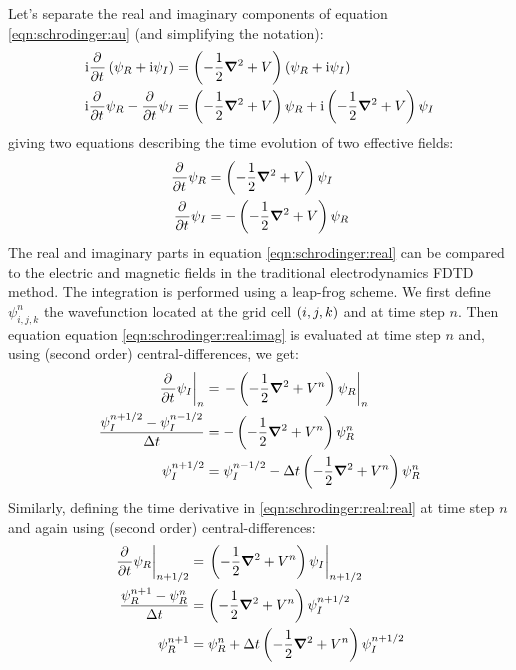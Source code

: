 Let's separate the real and imaginary components of equation
\eqref{eqn:schrodinger:au} (and simplifying the notation):
\begin{align}
\textrm{i} \frac{\partial^{{}}   }{\partial t^{{}}} \left(  \psi_R + \textrm{i} \psi_I \right)
    & = \left( -\frac{1}{2} \bm{\nabla}^2 + V  \right)
        \left(  \psi_R + \textrm{i} \psi_I \right) \\
\textrm{i} \frac{\partial^{{}}   }{\partial t^{{}}} \psi_R - \frac{\partial^{{}}   }{\partial t^{{}}} \psi_I
    & = \left( -\frac{1}{2} \bm{\nabla}^2 + V  \right) \psi_R
      + \textrm{i} \left( -\frac{1}{2} \bm{\nabla}^2 + V  \right) \psi_I
\end{align}
giving two equations describing the time evolution of two effective fields:
\begin{subequations}
\begin{align}
\frac{\partial^{{}}   }{\partial t^{{}}} \psi_R & =   \left( -\frac{1}{2} \bm{\nabla}^2 + V  \right) \psi_I
\label{eqn:schrodinger:real:real} \\
\frac{\partial^{{}}   }{\partial t^{{}}} \psi_I & = - \left( -\frac{1}{2} \bm{\nabla}^2 + V  \right) \psi_R
\label{eqn:schrodinger:real:imag}
\end{align}
\label{eqn:schrodinger:real}
\end{subequations}
The real and imaginary parts in equation \eqref{eqn:schrodinger:real} can be
compared to the electric and magnetic fields in the traditional electrodynamics
FDTD method. The integration is performed using a leap-frog scheme. We
first define $\psi_{i,j,k}^{n}$ the wavefunction located at the grid cell
$\left( i,j,k \right)$ and at time step $n$. Then equation equation
\eqref{eqn:schrodinger:real:imag} is evaluated at time step $n$ and, using
(second order) central-differences, we get:
\begin{align}
\left. \frac{\partial^{{}}   }{\partial t^{{}}} \psi_I \right|_{n}
& = \left. - \left( -\frac{1}{2} \bm{\nabla}^2 + V^{n}  \right) \psi_R \right|_{n} \\
\frac{\psi_{I}^{n+1/2} - \psi_{I}^{n-1/2}}{\Delta t}
& = - \left( -\frac{1}{2} \bm{\nabla}^2 + V^{n}  \right) \psi_{R}^{n} \\
\psi_{I}^{n+1/2}
& = \psi_{I}^{n-1/2} - \Delta t \left( -\frac{1}{2} \bm{\nabla}^2 + V^{n}  \right)
\psi_{R}^{n}
\label{eqn:schrodinger:real:imag:discretized}
\end{align}
Similarly, defining the time derivative in \eqref{eqn:schrodinger:real:real} at
time step $n$ and again using (second order) central-differences:
\begin{align}
\left. \frac{\partial^{{}}   }{\partial t^{{}}} \psi_R \right|_{n+1/2}
& = \left. \left( -\frac{1}{2} \bm{\nabla}^2 + V^{n}  \right) \psi_I \right|_{n+1/2} \\
\frac{\psi_{R}^{n+1} - \psi_{R}^{n}}{\Delta t}
& = \left( -\frac{1}{2} \bm{\nabla}^2 + V^{n}  \right) \psi_{I}^{n+1/2} \\
\psi_{R}^{n+1}
& = \psi_{R}^{n} + \Delta t \left( -\frac{1}{2} \bm{\nabla}^2 + V^{n}  \right)
\psi_{I}^{n+1/2}
\label{eqn:schrodinger:real:real:discretized}
\end{align}

